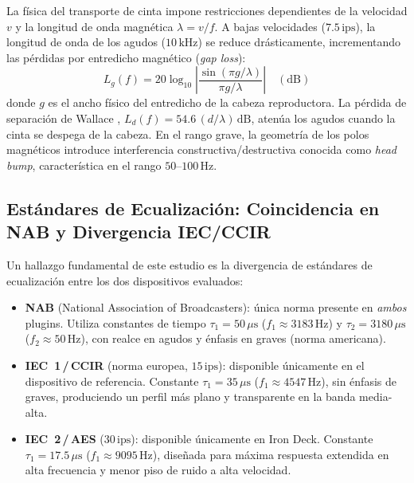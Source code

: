 \documentclass[10pt,conference]{IEEEtran}
\begin{document}
La física del transporte de cinta impone restricciones dependientes de la velocidad $v$ y
la longitud de onda magnética $\lambda = v/f$. A bajas velocidades ($7.5\,\text{ips}$),
la longitud de onda de los agudos ($10\,\text{kHz}$) se reduce drásticamente, incrementando
las pérdidas por entredicho magnético (\emph{gap loss}):
\begin{equation}
L_g(f) = 20\log_{10}\!\left|\frac{\sin(\pi g/\lambda)}{\pi g/\lambda}\right| \quad (\text{dB})
\end{equation}
donde $g$ es el ancho físico del entredicho de la cabeza reproductora. La pérdida de
separación de Wallace \cite{wallace}, $L_d(f)=54.6\,(d/\lambda)\,\text{dB}$, atenúa los
agudos cuando la cinta se despega de la cabeza. En el rango grave, la geometría de los polos
magnéticos introduce interferencia constructiva/destructiva conocida como \emph{head bump},
característica en el rango $50$–$100\,\text{Hz}$.

\subsection{Estándares de Ecualización: Coincidencia en NAB y Divergencia IEC/CCIR}

Un hallazgo fundamental de este estudio es la divergencia de estándares de ecualización entre
los dos dispositivos evaluados:

\begin{itemize}
    \item \textbf{NAB} (National Association of Broadcasters): única norma presente en
    \emph{ambos} plugins. Utiliza constantes de tiempo $\tau_1=50\,\mu\text{s}$
    ($f_1\approx 3183\,\text{Hz}$) y $\tau_2=3180\,\mu\text{s}$ ($f_2\approx 50\,\text{Hz}$),
    con realce en agudos y énfasis en graves (norma americana).

    \item \textbf{IEC~1\,/\,CCIR} (norma europea, $15\,\text{ips}$): disponible únicamente
    en el dispositivo de referencia. Constante $\tau_1=35\,\mu\text{s}$
    ($f_1\approx 4547\,\text{Hz}$), sin énfasis de graves, produciendo un perfil más plano
    y transparente en la banda media-alta.

    \item \textbf{IEC~2\,/\,AES} ($30\,\text{ips}$): disponible únicamente en Iron Deck.
    Constante $\tau_1=17.5\,\mu\text{s}$ ($f_1\approx 9095\,\text{Hz}$), diseñada para
    máxima respuesta extendida en alta frecuencia y menor piso de ruido a alta velocidad.
\end{itemize}
\end{document}
